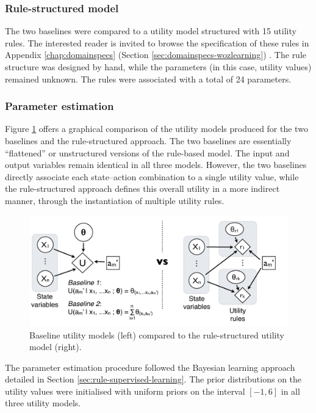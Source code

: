 \subsubsection*{Rule-structured model}
The two baselines were compared to a utility model structured with 15 utility rules. The interested reader is invited to browse the specification of these rules in Appendix \ref{chap:domainspecs} (Section \ref{sec:domainspecs-wozlearning}) . The rule structure was designed by hand, while the parameters (in this case, utility values) remained unknown. The rules were associated with a total of 24 parameters. 

\subsubsection*{Parameter estimation}

Figure \ref{fig:exp1_baselines} offers a graphical comparison of the utility models produced for the two baselines and the rule-structured approach.  The two baselines are essentially ``flattened'' or unstructured versions of the rule-based model.  The input and output variables remain identical in all three models. However, the two baselines directly associate each state--action combination to a single utility value, while the rule-structured approach defines this overall utility in a more indirect manner, through the instantiation of multiple utility rules. 

\begin{figure}[ht]
\centering
\includegraphics[scale=0.40]{imgs/exp1_baselines.pdf}
\caption{Baseline utility models (left) compared to the rule-structured utility model (right).}
\label{fig:exp1_baselines}
\end{figure}


The parameter estimation procedure followed the Bayesian learning approach detailed in Section \ref{sec:rule-supervised-learning}.  The prior distributions on the utility values were initialised with uniform priors on the interval $[-1,6]$ in all three utility models. 

